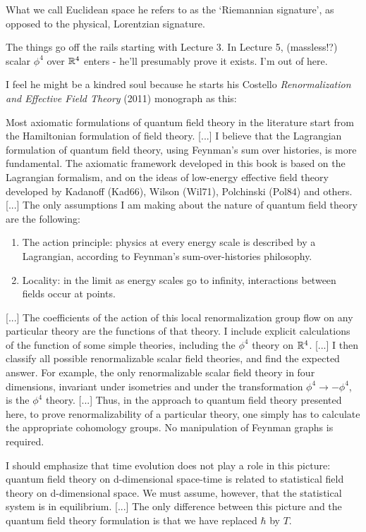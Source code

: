\begin{description}
What we call Euclidean space he refers to as the `Riemannian signature',
as opposed to the physical, Lorentzian signature.

The things go off the rails starting with Lecture 3. In Lecture 5,
(massless!?) scalar $\phi^4$ over $\mathbb{R}^4$ enters - he'll presumably
prove it exists. I'm out of here.


\bigskip

I feel he might be a kindred soul because he starts his
Costello {\em Renormalization and Effective Field Theory}
(2011) monograph as this:


Most axiomatic formulations of quantum field theory in the literature
start from the Hamiltonian formulation of field theory. [...]
I believe that the Lagrangian formulation of quantum field theory, using
Feynman’s sum over histories, is more fundamental. The axiomatic framework
developed in this book is based on the Lagrangian formalism, and on
the ideas of low-energy effective field theory developed by Kadanoff (Kad66),
Wilson (Wil71), Polchinski (Pol84) and others.
[...]
The only assumptions I am making about the nature of quantum field theory
are the following:
\begin{enumerate}
  \item
The action principle: physics at every energy scale is described by a
Lagrangian, according to Feynman’s sum-over-histories philosophy.
  \item
Locality: in the limit as energy scales go to infinity, interactions
between fields occur at points.
\end{enumerate}
[...] The coefficients of the action of this local renormalization group
flow on any particular theory are the functions of that theory. I include
explicit calculations of the function of some simple theories, including
the $\phi^4$ theory on $\mathbb{R}^4$.
[...]
I then classify all possible renormalizable scalar field theories,
and find the expected answer. For example, the only renormalizable scalar
field theory in four dimensions, invariant under isometries and under the
transformation $\phi^4\to-\phi^4$, is the $\phi^4$ theory.
[...]
Thus, in the approach to quantum field theory presented here, to
prove renormalizability of a particular theory, one simply has to
calculate the appropriate cohomology groups. No manipulation of Feynman
graphs is required.

I should emphasize that time evolution does not play a role in this picture:
quantum field theory on d-dimensional space-time is related to statistical
field theory on d-dimensional space. We must assume, however, that
the statistical system is in equilibrium.
[...]
The only difference between this picture and the quantum field theory formulation
is that we have replaced $\hbar$ by $T$.


\end{description}

